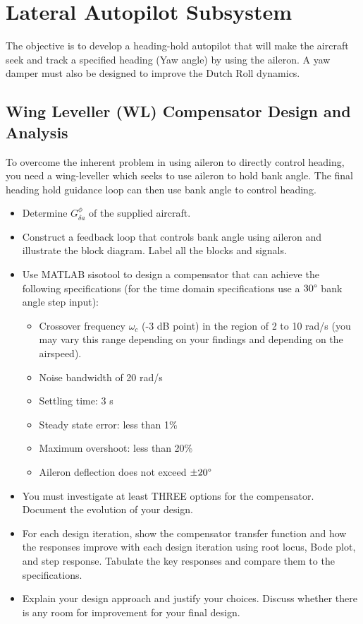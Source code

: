 \section{Lateral Autopilot Subsystem}

The objective is to develop a heading-hold autopilot that will make the aircraft seek and
track a specified heading (Yaw angle) by using the aileron. A yaw damper must also be
designed to improve the Dutch Roll dynamics.

\subsection{Wing Leveller (WL) Compensator Design and Analysis}

To overcome the inherent problem in using aileron to directly control heading, you need a wing-leveller which seeks to use aileron to hold bank angle. The final heading hold guidance loop can then use bank angle to control heading.
\begin{itemize}
\item Determine $G^{\phi}_{\delta a}$ of the supplied aircraft.
\item Construct a feedback loop that controls bank angle using aileron and illustrate the block diagram. Label all the blocks and signals.
\item Use MATLAB sisotool to design a compensator that can achieve the following specifications (for the time domain specifications use a $30 \degree$ bank angle step input):
\begin{itemize}
\item Crossover frequency $\omega_c$ (-3 dB point) in the region of 2 to 10 rad/s (you may vary this range depending on your findings and depending on the airspeed).
\item Noise bandwidth of 20 rad/s
\item Settling time: 3 s
\item Steady state error: less than 1\%
\item Maximum overshoot: less than 20\%
\item Aileron deflection does not exceed $\pm 20 \degree$
\end{itemize}
\item You must investigate at least THREE options for the compensator. Document the evolution of your design.
\item For each design iteration, show the compensator transfer function and how the responses improve with each design iteration using root locus, Bode plot, and step response. Tabulate the key responses and compare them to the specifications.
\item Explain your design approach and justify your choices. Discuss whether there is any room for improvement for your final design.
\end{itemize}

